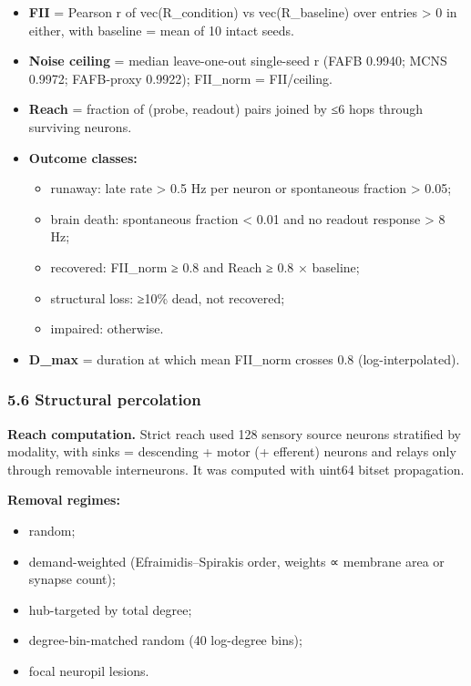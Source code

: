 \documentclass[11pt]{article}
\providecommand{\tightlist}{\setlength{\itemsep}{0pt}\setlength{\parskip}{0pt}}
\begin{document}
\begin{itemize}
\tightlist
\item
  \textbf{FII} = Pearson r of vec(R\_condition) vs vec(R\_baseline) over entries \textgreater{} 0 in either, with baseline = mean of 10 intact seeds.
\item
  \textbf{Noise ceiling} = median leave-one-out single-seed r (FAFB 0.9940; MCNS 0.9972; FAFB-proxy 0.9922); FII\_norm = FII/ceiling.
\item
  \textbf{Reach} = fraction of (probe, readout) pairs joined by ≤6 hops through surviving neurons.
\item
  \textbf{Outcome classes:}

  \begin{itemize}
  \tightlist
  \item
    runaway: late rate \textgreater{} 0.5 Hz per neuron or spontaneous fraction \textgreater{} 0.05;
  \item
    brain death: spontaneous fraction \textless{} 0.01 and no readout response \textgreater{} 8 Hz;
  \item
    recovered: FII\_norm ≥ 0.8 and Reach ≥ 0.8 × baseline;
  \item
    structural loss: ≥10\% dead, not recovered;
  \item
    impaired: otherwise.
  \end{itemize}
\item
  \textbf{D\_max} = duration at which mean FII\_norm crosses 0.8 (log-interpolated).
\end{itemize}

\subsubsection{5.6 Structural percolation}\label{structural-percolation}

\textbf{Reach computation.} Strict reach used 128 sensory source neurons stratified by modality, with sinks = descending + motor (+ efferent) neurons and relays only through removable interneurons. It was computed with uint64 bitset propagation.

\textbf{Removal regimes:}

\begin{itemize}
\tightlist
\item
  random;
\item
  demand-weighted (Efraimidis--Spirakis order, weights ∝ membrane area or synapse count);
\item
  hub-targeted by total degree;
\item
  degree-bin-matched random (40 log-degree bins);
\item
  focal neuropil lesions.
\end{itemize}
\end{document}

